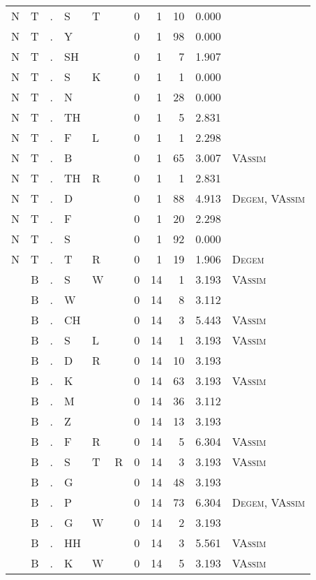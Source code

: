 \begin{longtable}{r@{ } r@{ } c@{ } l@{ } l@{ } l@{ } r r r r l }
N & T & . & S & T &  & 0 & 1 & 10 & 0.000 &  \\
N & T & . & Y &  &  & 0 & 1 & 98 & 0.000 &  \\
N & T & . & SH &  &  & 0 & 1 & 7 & 1.907 &  \\
N & T & . & S & K &  & 0 & 1 & 1 & 0.000 &  \\
N & T & . & N &  &  & 0 & 1 & 28 & 0.000 &  \\
N & T & . & TH &  &  & 0 & 1 & 5 & 2.831 &  \\
N & T & . & F & L &  & 0 & 1 & 1 & 2.298 &  \\
N & T & . & B &  &  & 0 & 1 & 65 & 3.007 & \textsc{VAssim} \\
N & T & . & TH & R &  & 0 & 1 & 1 & 2.831 &  \\
N & T & . & D &  &  & 0 & 1 & 88 & 4.913 & \textsc{Degem}, \textsc{VAssim} \\
N & T & . & F &  &  & 0 & 1 & 20 & 2.298 &  \\
N & T & . & S &  &  & 0 & 1 & 92 & 0.000 &  \\
N & T & . & T & R &  & 0 & 1 & 19 & 1.906 & \textsc{Degem} \\
 & B & . & S & W &  & 0 & 14 & 1 & 3.193 & \textsc{VAssim} \\
 & B & . & W &  &  & 0 & 14 & 8 & 3.112 &  \\
 & B & . & CH &  &  & 0 & 14 & 3 & 5.443 & \textsc{VAssim} \\
 & B & . & S & L &  & 0 & 14 & 1 & 3.193 & \textsc{VAssim} \\
 & B & . & D & R &  & 0 & 14 & 10 & 3.193 &  \\
 & B & . & K &  &  & 0 & 14 & 63 & 3.193 & \textsc{VAssim} \\
 & B & . & M &  &  & 0 & 14 & 36 & 3.112 &  \\
 & B & . & Z &  &  & 0 & 14 & 13 & 3.193 &  \\
 & B & . & F & R &  & 0 & 14 & 5 & 6.304 & \textsc{VAssim} \\
 & B & . & S & T & R & 0 & 14 & 3 & 3.193 & \textsc{VAssim} \\
 & B & . & G &  &  & 0 & 14 & 48 & 3.193 &  \\
 & B & . & P &  &  & 0 & 14 & 73 & 6.304 & \textsc{Degem}, \textsc{VAssim} \\
 & B & . & G & W &  & 0 & 14 & 2 & 3.193 &  \\
 & B & . & HH &  &  & 0 & 14 & 3 & 5.561 & \textsc{VAssim} \\
 & B & . & K & W &  & 0 & 14 & 5 & 3.193 & \textsc{VAssim} \\

\end{longtable}
